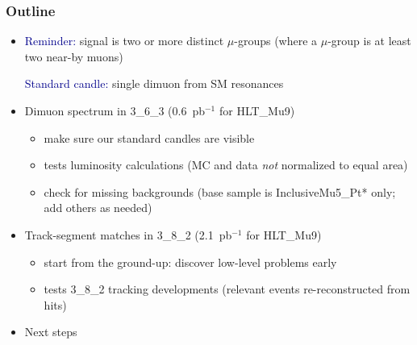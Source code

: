 \documentclass[compress]{beamer}
\begin{document}
\begin{frame}
\frametitle{Outline}
\begin{itemize}\setlength{\itemsep}{0.1 cm}
\item \textcolor{darkblue}{Reminder:} signal is two or more distinct
  $\mu$-groups (where a $\mu$-group is at least two near-by muons)

\textcolor{darkblue}{Standard candle:} single dimuon from SM resonances

\item Dimuon spectrum in 3\_6\_3 (0.6~pb$^{-1}$ for HLT\_Mu9)
\begin{itemize}\setlength{\itemsep}{0.1 cm}
\item make sure our standard candles are visible
\item tests luminosity calculations (MC and data {\it not} normalized to equal area)
\item check for missing backgrounds (base sample is InclusiveMu5\_Pt* only; add others as needed)
\end{itemize}

\item Track-segment matches in 3\_8\_2 (2.1~pb$^{-1}$ for HLT\_Mu9)
\begin{itemize}\setlength{\itemsep}{0.1 cm}
\item start from the ground-up: discover low-level problems early
\item tests 3\_8\_2 tracking developments (relevant events re-reconstructed from hits)
\end{itemize}

\item Next steps
\end{itemize}
\end{frame}
\end{document}
